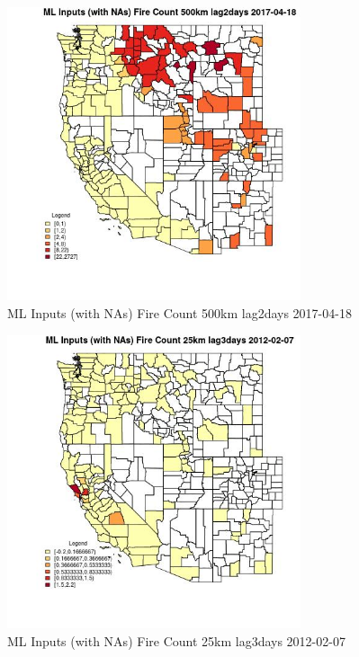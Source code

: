 \begin{figure} 
\centering  
\includegraphics[width=0.77\textwidth]{Code_Outputs/Report_ML_input_PM25_Step4_part_f_de_duplicated_aves_prioritize_24hr_obswNAs_CountyFire_Count_500km_lag2daysMean2017-04-18.jpg} 
\caption{\label{fig:Report_ML_input_PM25_Step4_part_f_de_duplicated_aves_prioritize_24hr_obswNAsCountyFire_Count_500km_lag2daysMean2017-04-18}ML Inputs (with NAs) Fire Count 500km lag2days 2017-04-18} 
\end{figure} 
 

\begin{figure} 
\centering  
\includegraphics[width=0.77\textwidth]{Code_Outputs/Report_ML_input_PM25_Step4_part_f_de_duplicated_aves_prioritize_24hr_obswNAs_CountyFire_Count_25km_lag3daysMean2012-02-07.jpg} 
\caption{\label{fig:Report_ML_input_PM25_Step4_part_f_de_duplicated_aves_prioritize_24hr_obswNAsCountyFire_Count_25km_lag3daysMean2012-02-07}ML Inputs (with NAs) Fire Count 25km lag3days 2012-02-07} 
\end{figure} 
 

